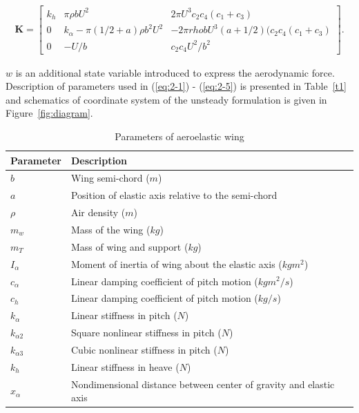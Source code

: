\documentclass[openacc]{rsproca_new}%
\def\vec#1{\ensuremath{\mathbf{#1}}}
\newcommand{\Eref}[1]{(\ref{#1})}
\newcommand{\Fref}[1]{Figure~\ref{#1}}
\newcommand{\Tref}[1]{Table~\ref{#1}}
\begin{document}
\begin{align}\label{eq:2-5}
\vec K=
\begin{bmatrix}
      k_h        & \pi \rho b U^2  & 2 \pi U^3 c_2 c_4 (c_1+c_3) \\
      0         & k_\alpha - \pi (1/2+a)\rho b^2 U^2 & -2 \pi rho b U^3 (a+1/2)(c_2c_4(c_1+c_3) \\
      0       & -U/b & c_2 c_4U^2/b^2
\end{bmatrix}.
\end{align}

\noindent $w$ is an additional state variable introduced to express the aerodynamic force. Description of parameters used in \Eref{eq:2-1} -  \Eref{eq:2-5} is presented in \Tref{t1} and schematics of coordinate system of the unsteady formulation is given in \Fref{fig:diagram}.


\begin{table}[!ht]
\caption{Parameters of aeroelastic wing}%
\label{table_example}
\begin{tabular}{ll}%
\hline
Parameter &Description \\
\hline
$b$ & Wing semi-chord ($m$) \\
$a$ & Position of elastic axis relative to the semi-chord  \\
$\rho$ & Air density ($m$) \\
$m_w$ & Mass of the wing ($kg$) \\
$m_T$ & Mass of wing and support ($kg$) \\
$I_\alpha$ & Moment of inertia of wing about the elastic axis ($kg m^2$) \\
$c_\alpha$ & Linear damping coefficient of pitch motion ($kg m^2/s$) \\
$c_h$ & Linear damping coefficient of pitch motion ($kg/s$) \\
$k_\alpha$ & Linear stiffness in pitch ($N$) \\
$k_{\alpha 2}$ & Square nonlinear stiffness in pitch  ($N$) \\
$k_{\alpha 3}$ & Cubic nonlinear stiffness in pitch ($N$) \\
$k_{h}$ & Linear stiffness in heave ($N$) \\
$x_\alpha$ & Nondimensional distance between center of gravity and elastic axis  \\
\hline
\end{tabular}
\vspace*{-4pt}
\end{table}%
\end{document}
